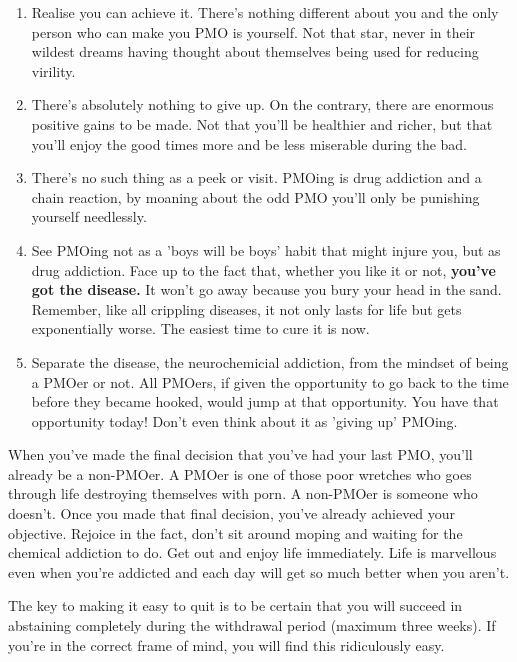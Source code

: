 \documentclass[easypeasy]{subfiles}
\begin{document}
\begin{enumerate}
  \item Realise you can achieve it. There's nothing different about you and the only person who can make you PMO is yourself. Not that star, never in their wildest dreams having thought about themselves being used for reducing virility.

  \item There's absolutely nothing to give up. On the contrary, there are enormous positive gains to be made. Not that you'll be healthier and richer, but that you'll enjoy the good times more and be less miserable during the bad.

  \item There's no such thing as a peek or visit. PMOing is drug addiction and a chain reaction, by moaning about the odd PMO you'll only be punishing yourself needlessly.

  \item See PMOing not as a 'boys will be boys' habit that might injure you, but as drug addiction. Face up to the fact that, whether you like it or not, \textbf{you've got the disease.} It won't go away because you bury your head in the sand. Remember, like all crippling diseases, it not only lasts for life but gets exponentially worse. The easiest time to cure it is now.

  \item Separate the disease, the neurochemicial addiction, from the mindset of being a PMOer or not. All PMOers, if given the opportunity to go back to the time before they became hooked, would jump at that opportunity. You have that opportunity today! Don't even think about it as 'giving up' PMOing.

\end{enumerate}

When you've made the final decision that you've had your last PMO, you'll already be a non-PMOer. A PMOer is one of those poor wretches who goes through life destroying themselves with porn. A non-PMOer is someone who doesn't. Once you made that final decision, you've already achieved your objective. Rejoice in the fact, don't sit around moping and waiting for the chemical addiction to do. Get out and enjoy life immediately. Life is marvellous even when you're addicted and each day will get so much better when you aren't.

The key to making it easy to quit is to be certain that you will succeed in abstaining completely during the withdrawal period (maximum three weeks). If you're in the correct frame of mind, you will find this ridiculously easy.
\end{document}
